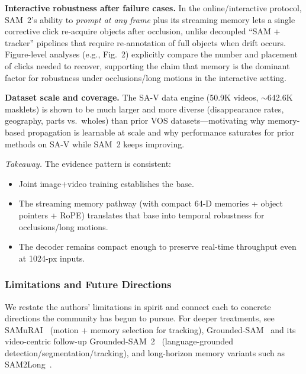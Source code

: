 \begin{enrichment}
\begin{enrichment}
		\textbf{Interactive robustness after failure cases.}
		In the online/interactive protocol, SAM~2’s ability to \emph{prompt at any frame} plus its streaming memory lets a single corrective click re-acquire objects after occlusion, unlike decoupled “SAM + tracker” pipelines that require re-annotation of full objects when drift occurs. Figure-level analyses (e.g., Fig.~2) explicitly compare the number and placement of clicks needed to recover, supporting the claim that memory is the dominant factor for robustness under occlusions/long motions in the interactive setting.
		
		\textbf{Dataset scale and coverage.}
		The SA-V data engine (50.9K videos, $\sim$642.6K masklets) is shown to be much larger and more diverse (disappearance rates, geography, parts vs.\ wholes) than prior VOS datasets—motivating why memory-based propagation is learnable at scale and why performance saturates for prior methods on SA-V while SAM~2 keeps improving.
		
		\smallskip\noindent\emph{Takeaway.}
		The evidence pattern is consistent:
		\begin{itemize}
			\item Joint image+video training establishes the base.
			\item The streaming memory pathway (with compact 64-D memories + object pointers + RoPE) translates that base into temporal robustness for occlusions/long motions.
			\item The decoder remains compact enough to preserve real-time throughput even at 1024-px inputs.
		\end{itemize}
		
		\newpage
		
		\subsubsection{Limitations and Future Directions}
		\label{enr:subsubsec_chapter15_sam2_limits}
		
		We restate the authors’ limitations in spirit and connect each to concrete directions the community has begun to pursue. For deeper treatments, see SAMuRAI~\cite{yang2024_samurai} (motion + memory selection for tracking), Grounded-SAM~\cite{ren2024_groundedsam} and its video-centric follow-up Grounded-SAM~2~\cite{groundedsam2_repo} (language-grounded detection/segmentation/tracking), and long-horizon memory variants such as SAM2Long~\cite{ding2024_sam2long}.
		

\end{enrichment}
\end{enrichment}
